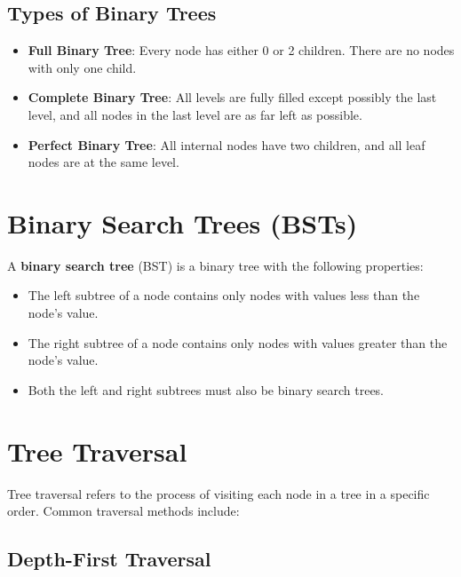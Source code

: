 \subsection{Types of Binary Trees}

\begin{itemize}
    \item \textbf{Full Binary Tree}: Every node has either 0 or 2 children. There are no nodes with only one child.
    \item \textbf{Complete Binary Tree}: All levels are fully filled except possibly the last level, and all nodes in the last level are as far left as possible.
    \item \textbf{Perfect Binary Tree}: All internal nodes have two children, and all leaf nodes are at the same level.
\end{itemize}

\section{Binary Search Trees (BSTs)}

A \textbf{binary search tree} (BST) is a binary tree with the following properties:
\begin{itemize}
    \item The left subtree of a node contains only nodes with values less than the node's value.
    \item The right subtree of a node contains only nodes with values greater than the node's value.
    \item Both the left and right subtrees must also be binary search trees.
\end{itemize}

\section{Tree Traversal}

Tree traversal refers to the process of visiting each node in a tree in a specific order. Common traversal methods include:

\subsection{Depth-First Traversal}

